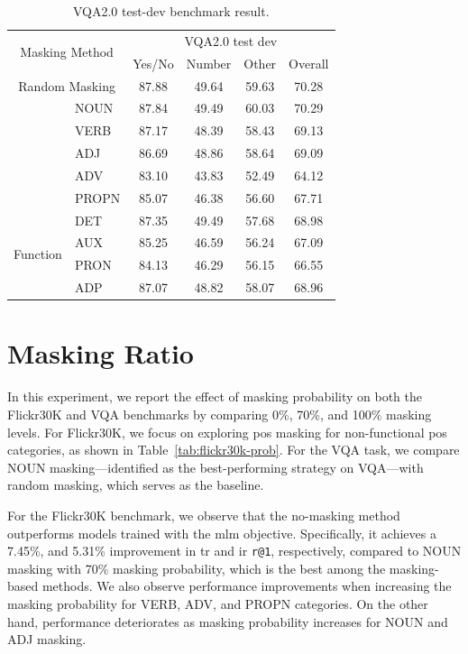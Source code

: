 \begin{table}[H]
    \centering
    \caption{VQA2.0 test-dev benchmark result.}
    \label{tab:vqa}
    \begin{adjustbox}{width=0.6\textwidth}
        \begin{tabular}{ll|cccc}
            \hline
            \multicolumn{2}{c|}{\multirow{2}{*}{Masking Method}} & \multicolumn{4}{c}{VQA2.0 test dev} \\
            & & Yes/No & Number & Other & Overall \\
            \hline
            \multicolumn{2}{c|}{Random Masking} & 87.88 & 49.64 & 59.63 & 70.28 \\
            \hline
            \rowcolor{green}\multirow{5}{*}{Non-function} & NOUN & 87.84 & 49.49 & 60.03 & 70.29 \\
            & VERB & 87.17 & 48.39 & 58.43 & 69.13 \\
            & ADJ & 86.69 & 48.86 & 58.64 & 69.09 \\
            & ADV & 83.10 & 43.83 & 52.49 & 64.12 \\
            & PROPN & 85.07 & 46.38 & 56.60 & 67.71 \\
            \hline
            \multirow{4}{*}{Function} & DET & 87.35 & 49.49 & 57.68 & 68.98 \\
            & AUX & 85.25 & 46.59 & 56.24 & 67.09 \\
            & PRON & 84.13 & 46.29 & 56.15 & 66.55 \\
            & ADP & 87.07 & 48.82 & 58.07 & 68.96 \\
            \hline
        \end{tabular}
    \end{adjustbox}
\end{table}

\section{Masking Ratio}
In this experiment, we report the effect of masking probability on both the Flickr30K and VQA benchmarks by comparing 0\%, 70\%, and 100\% masking levels.
For Flickr30K, we focus on exploring \acrshort{pos} masking for non-functional \acrshort{pos} categories, as shown in Table~\ref{tab:flickr30k-prob}.
For the VQA task, we compare NOUN masking—identified as the best-performing strategy on VQA—with random masking, which serves as the baseline.

For the Flickr30K benchmark, we observe that the no-masking method outperforms models trained with the \acrshort{mlm} objective.
Specifically, it achieves a 7.45\%, and 5.31\% improvement in \acrshort{tr} and \acrshort{ir} \texttt{r@1}, respectively, compared to NOUN masking with 70\% masking probability, which is the best among the masking-based methods.
We also observe performance improvements when increasing the masking probability for VERB, ADV, and PROPN categories.
On the other hand, performance deteriorates as masking probability increases for NOUN and ADJ masking.

